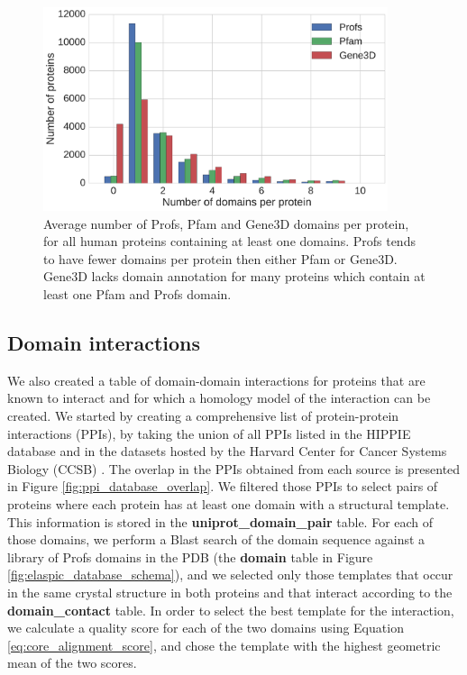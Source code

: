 \begin{figure}[!tb]
	\centering
	\includegraphics[width=0.9\textwidth]{static/profs/domains_per_protein.pdf}
	\caption[Profs, Pfam, and Gene3D domains per protein.]{Average number of Profs, Pfam and Gene3D domains per protein, for all human proteins containing at least one domains. Profs tends to have fewer domains per protein then either Pfam or Gene3D. Gene3D lacks domain annotation for many proteins which contain at least one Pfam and Profs domain.}
	\label{fig:profs_domain_size}
\end{figure}


\subsection{Domain interactions}

We also created a table of domain-domain interactions for proteins that are known to interact and for which a homology model of the interaction can be created. We started by creating a comprehensive list of protein-protein interactions (PPIs), by taking the union of all PPIs listed in the HIPPIE database \cite{schaefer_hippie:_2012} and in the datasets hosted by the Harvard Center for Cancer Systems Biology (CCSB) \cite{rolland_proteome-scale_2014}. The overlap in the PPIs obtained from each source is presented in Figure \ref{fig:ppi_database_overlap}. We filtered those PPIs to select pairs of proteins where each protein has at least one domain with a structural template. This information is stored in the \textbf{uniprot\_domain\_pair} table. For each of those domains, we perform a Blast search of the domain sequence against a library of Profs domains in the PDB (the \textbf{domain} table in Figure \ref{fig:elaspic_database_schema}), and we selected only those templates that occur in the same crystal structure in both proteins and that interact according to the \textbf{domain\_contact} table. In order to select the best template for the interaction, we calculate a quality score for each of the two domains using Equation \ref{eq:core_alignment_score}, and chose the template with the highest geometric mean of the two scores.

